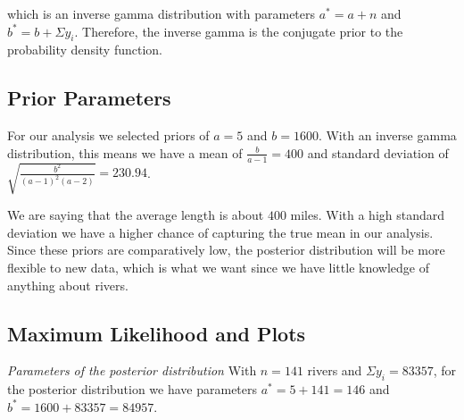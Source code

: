 \documentclass[12pt]{article}
\begin{document}
\noindent which is an inverse gamma distribution with parameters $a^*=a+n$ and $b^*=b+\Sigma y_i$.  Therefore, the inverse gamma is the conjugate prior to the probability density function.


\subsection{Prior Parameters}

\noindent For our analysis we selected priors of $a=5$ and $b=1600$.  With an inverse gamma distribution, this means we have a mean of $\frac{b}{a-1}=400$ and standard deviation of $\sqrt{\frac{b^2}{(a-1)^2(a-2)}}=230.94$.
\bigskip

\noindent We are saying that the average length is about $400$ miles.  With a high standard deviation we have a higher chance of capturing the true mean in our analysis.  Since these priors are comparatively low, the posterior distribution will be more flexible to new data, which is what we want since we have little knowledge of anything about rivers.

\subsection{Maximum Likelihood and Plots}

%

\noindent \emph{Parameters of the posterior distribution} With $n=141$ rivers and $\Sigma y_i=83357$, for the posterior distribution we have parameters $a^*=5+141=146$ and $b^*=1600+83357=84957$.
\bigskip
\end{document}
